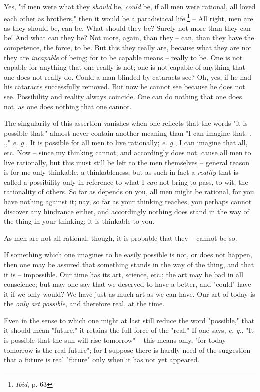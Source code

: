 Yes, "{}if men were what they \textit{should} be, \textit{could} be, if all 
men were rational, all loved each other as brothers,"{} then it would be a 
paradisiacal life.\footnote{\textit{Ibid}, p. 63} -- All right, men are as 
they should be, can be. What should they be? Surely not more than they can be! 
And what can they be? Not more, again, than they -- can, than they have the 
competence, the force, to be. But this they really are, because what they are 
not they are \textit{incapable} of being; for to be capable means -- really to 
be. One is not capable for anything that one really is not; one is not capable 
of anything that one does not really do. Could a man blinded by cataracts see? 
Oh, yes, if he had his cataracts successfully removed. But now he cannot see 
because he does not see. Possibility and reality always coincide. One can do 
nothing that one does not, as one does nothing that one cannot.

The singularity of this assertion vanishes when one reflects that the words 
"{}it is possible that."{} almost never contain another meaning than "{}I can 
imagine that. . .,"{} \textit{e. g.}, It is possible for all men to live 
rationally; \textit{e. g.}, I can imagine that all, etc. Now -- since my 
thinking cannot, and accordingly does not, cause all men to live rationally, 
but this must still be left to the men themselves -- general reason is for me 
only thinkable, a thinkableness, but as such in fact a \textit{reality} that 
is called a possibility only in reference to what I \textit{can} not bring to 
pass, to wit, the rationality of others. So far as depends on you, all men 
might be rational, for you have nothing against it; nay, so far as your 
thinking reaches, you perhaps cannot discover any hindrance either, and 
accordingly nothing does stand in the way of the thing in your thinking; it is 
thinkable to you.

As men are not all rational, though, it is probable that they -- cannot be so.

If something which one imagines to be easily possible is not, or does not 
happen, then one may be assured that something stands in the way of the thing, 
and that it is -- impossible. Our time has its art, science, etc.; the art may 
be bad in all conscience; but may one say that we deserved to have a better, 
and "{}could"{} have it if we only would? We have just as much art as we can 
have. Our art of today is the \textit{only art possible}, and therefore real, 
at the time.

Even in the sense to which one might at last still reduce the word 
"{}possible,"{} that it should mean "{}future,"{} it retains the full force of 
the "{}real."{} If one says, \textit{e. g.}, "{}It is possible that the sun 
will rise tomorrow"{} -- this means only, "{}for today tomorrow is the real 
future"{}; for I suppose there is hardly need of the suggestion that a future 
is real "{}future"{} only when it has not yet appeared.

